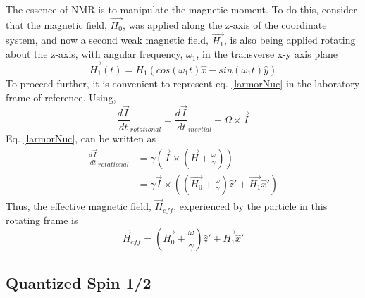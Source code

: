 The essence of NMR is to manipulate the magnetic moment. To do this, consider that the magnetic field, $\vec{H_0}$, was applied along the z-axis of the coordinate system, and now a second weak magnetic field, $\vec{H_1}$, is also being applied rotating about the z-axis, with angular frequency, $\omega_1$, in the transverse x-y axis plane
\begin{equation}
    \vec{H_1} \left(t \right) = H_1 \left( cos(\omega_1 t)\hat{x}-sin(\omega_1 t)\hat{y}  \right)
\end{equation}
To proceed further, it is convenient to represent eq. \ref{larmorNuc} in the laboratory frame of reference. Using,
\begin{equation}
    \frac{d\vec{I}}{dt}_{rotational} = \frac{d\vec{I}}{dt}_{inertial} - \Omega \times \vec{I} 
\end{equation}
Eq. \ref{larmorNuc}, can be written as
\begin{equation}
\begin{split}
    \frac{d\vec{I}}{dt}_{rotational} &  = \gamma \left( \vec{I} \times \left( \vec{H} +\frac{\omega}{\gamma}\right) \right) \\
    & = \gamma \vec{I} \times \left( \left( \vec{H_0} +\frac{\omega}{\gamma}\right)\hat{z}' + \vec{H_1}\hat{x}' \right)
\end{split}
\end{equation}
Thus, the effective magnetic field, $\vec{H}_{eff}$, experienced by the particle in this rotating frame is
\begin{equation}
    \vec{H}_{eff} = \left( \vec{H_0} +\frac{\omega}{\gamma}\right)\hat{z}' + \vec{H_1}\hat{x}' 
\end{equation}

\subsection{Quantized Spin 1/2}